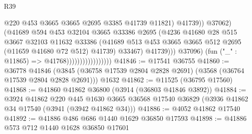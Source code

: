 \begin{lexlean}{R39}
\begin{coremodule}
                                                  @220
                                                  @453
                                                  @3665
                                                  @3665
                                                  @2695
                                                  @3385
                                                  @41739
                                                  @11821)
                                                @41739))
                                            @37062)
                                          (@41689
                                            @594
                                            @453
                                            @32104
                                            @3665
                                            @33386
                                            @2695
                                            (@4236
                                              @41680
                                              @28
                                              @515
                                              @3667
                                              @32103
                                              @11632
                                              @33386
                                              (@41689
                                                @513
                                                @453
                                                @3665
                                                @3665
                                                @512
                                                @2695
                                                (@11659 @41680 @72 @512)
                                                @41739)
                                              @33467)
                                            @41739)))
                                      @37096)
                                    (fun ("_" : @11865) => @41768)))))))))))))))))
@41846 := @17541 @36755
@41860 := @36778
    @41846
    (@3845 (@36758 @17539 @2804 @2828 @2691) (@3568 (@36764 @17539 @2804 @2828 @2691)))
    @1632
@41862 := @11525 (@36795 @17560)
@41868 := @41860 @41862 @36800 (@3914 (@36803 @41846 @3892))
@41884 := @3924
    @41862
    @220
    @445
    @1630
    @3665
    @36568
    @17540
    @36829
    (@3936 @41862 @34 @17540 (@3941 (@3942 @41862 @34)))
@41886 := @4052 @41862 @17540
@41892 := @41886 @486 @686 @1440 @1629 @36850 @17593
@41898 := @41886 @573 @712 @1440 @1628 @36850 @17601

\end{coremodule}
\end{lexlean}
